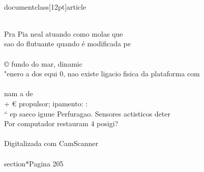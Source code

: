 \\documentclass[12pt]{article}
\begin{document}
\\
Pra Pia neal atuando como molas que\\
sao do flutuante quando é modificada pe\\
\\
© fundo do mar, dinamic\\
"enero a dos equi 0, nao existe ligacio fisica da plataforma com\\
\\
nam a de\\
+ € propulsor; ipamento: :\\
“ ep saeco iguue Perfuragao. Sensores actisticos deter\\
Por computador restauram 4 posigi?\\
\\
Digitalizada com CamScanner\\

\\section*{Pagina 205}
\end{document}
